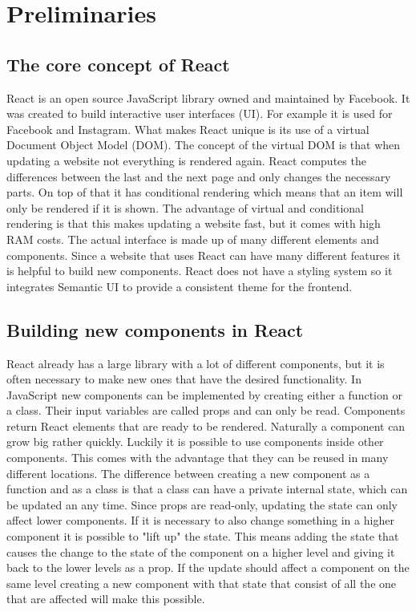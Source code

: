 \documentclass[11pt,a4paper]{article}
\begin{document}
\section{Preliminaries} \label{preliminaries}
\subsection{The core concept of React} 
React is an open source JavaScript library owned and maintained by Facebook.	It was created to build interactive user interfaces (UI).
For example it is used for Facebook and Instagram.
What makes React unique is its use of a virtual Document Object Model (DOM).
The concept of the virtual DOM is that when updating a website not everything is rendered again.
React computes the differences between the last and the next page and only changes the necessary parts.
On top of that it has conditional rendering which means that an item will only be rendered if it is shown.
The advantage of virtual and conditional rendering is that this makes updating a website fast, but it comes with high RAM costs.
The actual interface is made up of many different elements and components.
Since a website that uses React can have many different features it is helpful to build new components.
\cite{reactjs}
React does not have a styling system so it integrates Semantic UI to provide a consistent theme for the frontend.

\subsection{Building new components in React}
React already has a large library with a lot of different components, but it is often necessary to make new ones that have the desired functionality.
In JavaScript new components can be implemented by creating either a function or a class.
Their input variables are called props and can only be read.
Components return React elements that are ready to be rendered.
Naturally a component can grow big rather quickly.
Luckily it is possible to use components inside other components.
This comes with the advantage that they can be reused in many different locations.
The difference between creating a new component as a function and as a class is that a class can have a private internal state, which can be updated an any time.
Since props are read-only, updating the state can only affect lower components.
If it is necessary to also change something in a higher component it is possible to "lift up" the state.
This means adding the state that causes the change to the state of the component on a higher level and giving it back to the lower levels as a prop.
If the update should affect a component on the same level creating a new component with that state that consist of all the one that are affected will  make this possible.
\cite{reactjsGS}
\end{document}

